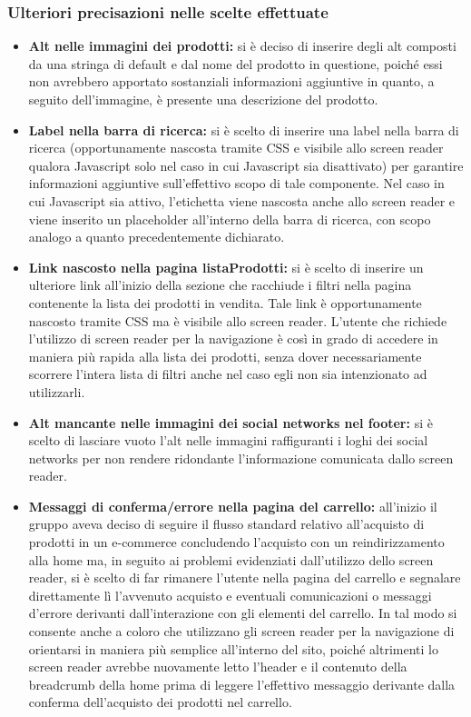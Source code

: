  \subsubsection{Ulteriori precisazioni nelle scelte effettuate}
 \begin{itemize}
     \item \textbf{Alt nelle immagini dei prodotti:} si è deciso di inserire degli alt composti da una stringa di default e dal nome del prodotto in questione, poiché essi non avrebbero apportato sostanziali informazioni aggiuntive in quanto, a seguito dell'immagine, è presente una descrizione del prodotto.
     \item \textbf{Label nella barra di ricerca:} si è scelto di inserire una label nella barra di ricerca (opportunamente nascosta tramite CSS e visibile allo screen reader qualora Javascript solo nel caso in cui Javascript sia disattivato) per garantire informazioni aggiuntive sull'effettivo scopo di tale componente. Nel caso in cui Javascript sia attivo, l'etichetta viene nascosta anche allo screen reader e viene inserito un placeholder all'interno della barra di ricerca, con scopo analogo a quanto precedentemente dichiarato.  
     \item \textbf{Link nascosto nella pagina listaProdotti:} si è scelto di inserire un ulteriore link all'inizio della sezione che racchiude i filtri nella pagina contenente la lista dei prodotti in vendita. Tale link è opportunamente nascosto tramite CSS ma è visibile allo screen reader. L'utente che richiede l'utilizzo di screen reader per la navigazione è così in grado di accedere in maniera più rapida alla lista dei prodotti, senza dover necessariamente scorrere l'intera lista di filtri anche nel caso egli non sia intenzionato ad utilizzarli.
     \item \textbf{Alt mancante nelle immagini dei social networks nel footer:} si è scelto di lasciare vuoto l'alt nelle immagini raffiguranti i loghi dei social networks per non rendere ridondante l'informazione comunicata dallo screen reader. 
     \item \textbf{Messaggi di conferma/errore nella pagina del carrello:} all'inizio il gruppo aveva deciso di seguire il flusso standard relativo all'acquisto di prodotti in un e-commerce concludendo l'acquisto con un reindirizzamento alla home ma, in seguito ai problemi evidenziati dall'utilizzo dello screen reader, si è scelto di far rimanere l'utente nella pagina del carrello e segnalare direttamente lì l'avvenuto acquisto e eventuali comunicazioni o messaggi d'errore derivanti dall'interazione con gli elementi del carrello. In tal modo si consente anche a coloro che utilizzano gli screen reader per la navigazione di orientarsi in maniera più semplice all'interno del sito, poiché altrimenti lo screen reader avrebbe nuovamente letto l'header e il contenuto della breadcrumb della home prima di leggere l'effettivo messaggio derivante dalla conferma dell'acquisto dei prodotti nel carrello.
 \end{itemize}

